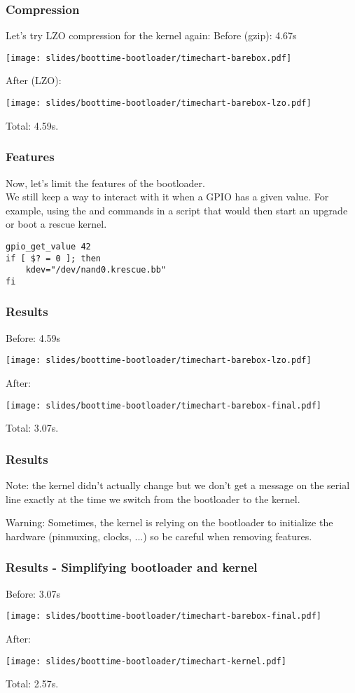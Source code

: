 \begin{frame}
\frametitle{Compression}
Let's try LZO compression for the kernel again:
Before (gzip): 4.67s
\begin{center}
    \texttt{[image: slides/boottime-bootloader/timechart-barebox.pdf]}
\end{center}
After (LZO):
\begin{center}
    \texttt{[image: slides/boottime-bootloader/timechart-barebox-lzo.pdf]}
\end{center}
Total: 4.59s.
\end{frame}

\begin{frame}[fragile]
\frametitle{Features}
Now, let's limit the features of the bootloader.\\
We still keep a way to interact with it when a GPIO has a given value.
For example, using the  and
 commands in a script that would then start an
upgrade or boot a rescue kernel.
\begin{block}{}
\begin{verbatim}
gpio_get_value 42
if [ $? = 0 ]; then
    kdev="/dev/nand0.krescue.bb"
fi
\end{verbatim}
\end{block}
\end{frame}

\begin{frame}
\frametitle{Results}
Before: 4.59s
\begin{center}
    \texttt{[image: slides/boottime-bootloader/timechart-barebox-lzo.pdf]}
\end{center}
After:
\begin{center}
    \texttt{[image: slides/boottime-bootloader/timechart-barebox-final.pdf]}
\end{center}
Total: 3.07s.
\end{frame}

\begin{frame}
\frametitle{Results}
Note: the kernel didn't actually change but we don't get a message on
the serial line exactly at the time we switch from the bootloader to
the kernel.

Warning: Sometimes, the kernel is relying on the bootloader to
initialize the hardware (pinmuxing, clocks, ...) so be careful when
removing features.
\end{frame}

\begin{frame}
\frametitle{Results - Simplifying bootloader and kernel}

Before: 3.07s
\begin{center}
    \texttt{[image: slides/boottime-bootloader/timechart-barebox-final.pdf]}
\end{center}
After:
\begin{center}
    \texttt{[image: slides/boottime-bootloader/timechart-kernel.pdf]}
\end{center}
Total: 2.57s.
\end{frame}

